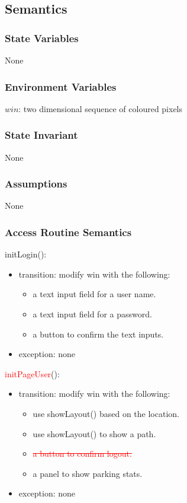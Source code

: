 \documentclass[12pt, titlepage]{article}
\begin{document}
\subsection{Semantics}

\subsubsection{State Variables}
None

\subsubsection{Environment Variables}
$win$: two dimensional sequence of coloured pixels

\subsubsection{State Invariant}
None

\subsubsection{Assumptions}
None

\subsubsection{Access Routine Semantics}

\noindent initLogin():
\begin{itemize} 
\item transition: modify win with the following:
\begin{itemize} 
\item a text input field for a user name.
\item a text input field for a password.
\item a button to confirm the text inputs.
\end{itemize}
\item exception: none
\end{itemize}

\noindent \textcolor{red}{initPageUser}():
\begin{itemize} 
\item transition: modify win with the following:
\begin{itemize} 
\item use showLayout() based on the location.
\item use showLayout() to show a path.
\item \textcolor{red}{\st{a button to confirm logout.}}
\item a panel to show parking stats.
\end{itemize}
\item exception: none
\end{itemize}
\end{document}
